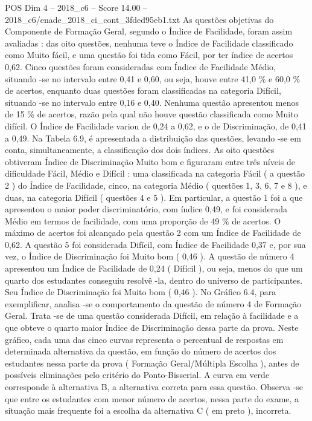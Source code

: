 \begin{textsample}{POS Dim 4 – 2018\_c6 – Score 14.00 – 2018\_c6/enade\_2018\_ci\_cont\_3fded95eb1.txt}
As questões objetivas do Componente de Formação Geral, segundo o Índice de Facilidade, foram assim avaliadas : das oito questões, nenhuma teve o Índice de Facilidade classificado como Muito fácil, e uma questão foi tida como Fácil, por ter índice de acertos 0,62.
Cinco questões foram consideradas com Índice de Facilidade Médio, situando -se no intervalo entre 0,41 e 0,60, ou seja, houve entre 41,0 \% e 60,0 \% de acertos, enquanto duas questões foram classificadas na categoria Difícil, situando -se no intervalo entre 0,16 e 0,40.
Nenhuma questão apresentou menos de 15 \% de acertos, razão pela qual não houve questão classificada como Muito difícil.
O Índice de Facilidade variou de 0,24 a 0,62, e o de Discriminação, de 0,41 a 0,49.
Na Tabela 6.9, é apresentada a distribuição das questões, levando -se em conta, simultaneamente, a classificação dos dois índices.
As oito questões obtiveram Índice de Discriminação Muito bom e figuraram entre três níveis de dificuldade Fácil, Médio e Difícil : uma classificada na categoria Fácil ( a questão 2 ) do Índice de Facilidade, cinco, na categoria Médio ( questões 1, 3, 6, 7 e 8 ), e duas, na categoria Difícil ( questões 4 e 5 ).
Em particular, a questão 1 foi a que apresentou o maior poder discriminatório, com índice 0,49, e foi considerada Médio em termos de facilidade, com uma proporção de 49 \% de acertos.
O máximo de acertos foi alcançado pela questão 2 com um Índice de Facilidade de 0,62.
A questão 5 foi considerada Difícil, com Índice de Facilidade 0,37 e, por sua vez, o Índice de Discriminação foi Muito bom ( 0,46 ).
A questão de número 4 apresentou um Índice de Facilidade de 0,24 ( Difícil ), ou seja, menos do que um quarto dos estudantes conseguiu resolvê -la, dentro do universo de participantes.
Seu Índice de Discriminação foi Muito bom ( 0,46 ).
No Gráfico 6.4, para exemplificar, analisa -se o comportamento da questão de número 4 de Formação Geral.
Trata -se de uma questão considerada Difícil, em relação à facilidade e a que obteve o quarto maior Índice de Discriminação dessa parte da prova.
Neste gráfico, cada uma das cinco curvas representa o percentual de respostas em determinada alternativa da questão, em função do número de acertos dos estudantes nessa parte da prova ( Formação Geral/Múltipla Escolha ), antes de possíveis eliminações pelo critério do Ponto-Bisserial.
A curva em verde corresponde à alternativa B, a alternativa correta para essa questão.
Observa -se que entre os estudantes com menor número de acertos, nessa parte do exame, a situação mais frequente foi a escolha da alternativa C ( em preto ), incorreta.

\end{textsample}
